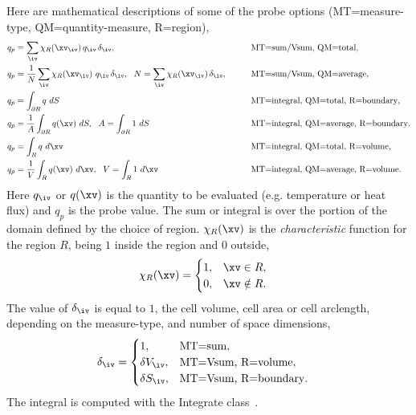 Here are mathematical descriptions of some of the probe options (MT=measure-type, QM=quantity-measure, R=region), 
\begin{alignat}{3}
   q_p  &= \sum_{\iv} \chi_R(\xv_\iv)\,q_{\iv}\, \delta_\iv ,                               \qquad && \text{MT=sum/Vsum, QM=total}, \\
   q_p  &=\frac{1}{N} \sum_{\iv} \chi_R(\xv_\iv)~q_{\iv}\, \delta_\iv ,~~ N=\sum_{\iv} \chi_R(\xv_\iv)\, \delta_\iv,  \qquad && \text{MT=sum/Vsum, QM=average}, \\
   q_p  &= \int_{\partial R} q ~dS                           \qquad && \text{MT=integral, QM=total, R=boundary}, \\
   q_p  &= \frac{1}{A} \int_{\partial R} q(\xv) ~dS,~~ A=\int_{\partial R} 1 ~dS     \qquad && \text{MT=integral, QM=average, R=boundary}.\\
   q_p  &= \int_{R} q ~d\xv                          \qquad && \text{MT=integral, QM=total, R=volume}, \\
   q_p  &= \frac{1}{V} \int_{R} q(\xv) ~d\xv,~~ V=\int_{R} 1 ~d\xv     \qquad && \text{MT=integral, QM=average, R=volume}.
\end{alignat}
Here $q_\iv$ or $q(\xv)$ is the quantity to be evaluated (e.g. temperature or heat flux) and $q_p$ is the probe value. 
The sum or integral is over
the portion of the domain defined by the choice of region. $\chi_R(\xv)$ is the {\em characteristic} function
for the region $R$, being $1$ inside the region and $0$ outside,
\begin{align}
   \chi_R(\xv) &= \begin{cases} 1, & \text{$\xv\in R$}, \\
                                0, & \text{$\xv\notin R$} .
                      \end{cases} 
\end{align} 
The value of $\delta_\iv$ is equal to $1$, the cell volume, cell area or cell arclength, depending on the measure-type, 
and number of space dimensions,
\begin{align}
   \delta_\iv &= \begin{cases} 1, & \text{MT=sum}, \\
                               \delta V_\iv, & \text{MT=Vsum, R=volume},  \\
                               \delta S_\iv, & \text{MT=Vsum, R=boundary}.
                      \end{cases}
\end{align} 
The integral is computed with the Integrate class~\cite{OTHERSTUFF}.


